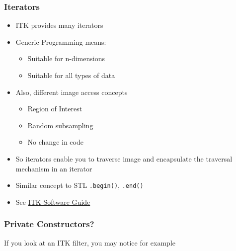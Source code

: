 \subsubsection{Iterators}\label{iterators}

\begin{itemize}
\itemsep1pt\parskip0pt
\item
  ITK provides many iterators
\item
  Generic Programming means:

  \begin{itemize}
  \itemsep1pt\parskip0pt
  \item
    Suitable for n-dimensions
  \item
    Suitable for all types of data
  \end{itemize}
\item
  Also, different image access concepts

  \begin{itemize}
  \itemsep1pt\parskip0pt
  \item
    Region of Interest
  \item
    Random subsampling
  \item
    No change in code
  \end{itemize}
\item
  So iterators enable you to traverse image and encapsulate the
  traversal mechanism in an iterator\\
\item
  Similar concept to STL \texttt{.begin()}, \texttt{.end()}
\item
  See \href{http://www.itk.org/ItkSoftwareGuide.pdf}{ITK Software Guide}
\end{itemize}

\subsubsection{Private Constructors?}\label{private-constructors}

If you look at an ITK filter, you may notice for example

\begin{Shaded}
\begin{Highlighting}[]
    \NormalTok{:}
       

    \NormalTok{:}
       
       \NormalTok{=(} 
\end{Highlighting}
\end{Shaded}

